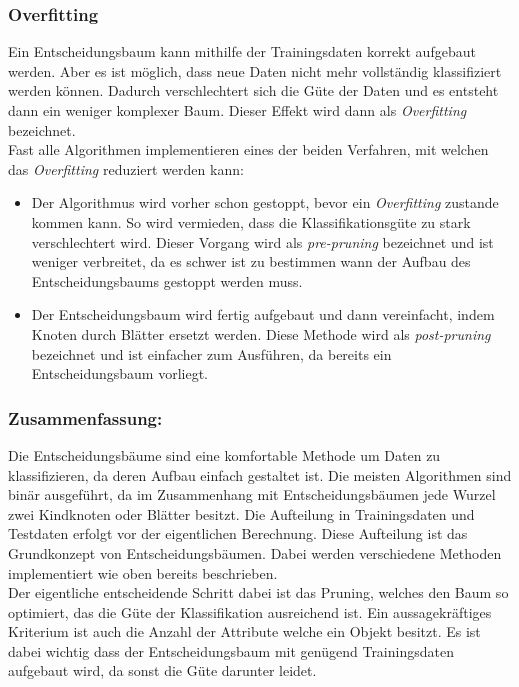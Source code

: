 \subsubsection{Overfitting} 
Ein Entscheidungsbaum kann mithilfe der Trainingsdaten korrekt aufgebaut werden. Aber es ist möglich, dass neue Daten nicht mehr vollständig klassifiziert werden können. Dadurch verschlechtert sich die Güte der Daten und es entsteht dann ein weniger komplexer Baum. Dieser Effekt wird dann als \textit{Overfitting} bezeichnet. \cite{mitch97}\\

 Fast alle Algorithmen implementieren eines der beiden Verfahren, mit welchen das \textit{Overfitting} reduziert werden kann:\\
\begin{itemize}
	\item Der Algorithmus wird vorher schon gestoppt, bevor ein \textit{Overfitting} zustande kommen kann. So wird vermieden, dass die Klassifikationsgüte zu stark verschlechtert wird. Dieser Vorgang wird als \textit{pre-pruning} bezeichnet und ist weniger verbreitet, da es schwer ist zu bestimmen wann der Aufbau des Entscheidungsbaums gestoppt werden muss.
	
	\item Der Entscheidungsbaum wird fertig aufgebaut und dann vereinfacht, indem Knoten durch Blätter ersetzt werden. Diese Methode wird als \textit{post-pruning} bezeichnet und ist einfacher zum Ausführen, da bereits ein Entscheidungsbaum vorliegt. 
\end{itemize}
\cite{mitch97}

\subsubsection{Zusammenfassung:}
Die Entscheidungsbäume sind eine komfortable Methode um Daten zu klassifizieren, da deren Aufbau einfach gestaltet ist. Die meisten Algorithmen sind binär ausgeführt, da im Zusammenhang mit Entscheidungsbäumen jede Wurzel zwei Kindknoten oder Blätter besitzt. Die Aufteilung in Trainingsdaten und Testdaten erfolgt vor der eigentlichen Berechnung. Diese Aufteilung ist das Grundkonzept von Entscheidungsbäumen. Dabei werden verschiedene Methoden implementiert wie oben bereits beschrieben. \\
Der eigentliche entscheidende Schritt dabei ist das Pruning, welches den Baum so optimiert, das die Güte der Klassifikation ausreichend ist. Ein aussagekräftiges Kriterium ist auch die Anzahl der Attribute welche ein Objekt besitzt. Es ist dabei wichtig dass der Entscheidungsbaum mit genügend Trainingsdaten aufgebaut wird, da sonst die Güte darunter leidet.\\ \cite{brei84}

